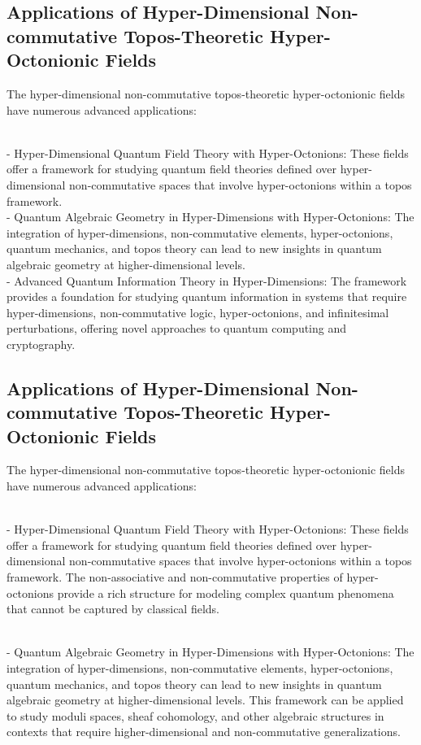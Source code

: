 \documentclass{article}
\begin{document}
\subsection{Applications of Hyper-Dimensional Non-commutative Topos-Theoretic Hyper-Octonionic Fields}
The hyper-dimensional non-commutative topos-theoretic hyper-octonionic fields have numerous advanced applications:

{\ }\\
- Hyper-Dimensional Quantum Field Theory with Hyper-Octonions: These fields offer a framework for studying quantum field theories defined over hyper-dimensional non-commutative spaces that involve hyper-octonions within a topos framework.
{\ }\\
- Quantum Algebraic Geometry in Hyper-Dimensions with Hyper-Octonions: The integration of hyper-dimensions, non-commutative elements, hyper-octonions, quantum mechanics, and topos theory can lead to new insights in quantum algebraic geometry at higher-dimensional levels.
{\ }\\
- Advanced Quantum Information Theory in Hyper-Dimensions: The framework provides a foundation for studying quantum information in systems that require hyper-dimensions, non-commutative logic, hyper-octonions, and infinitesimal perturbations, offering novel approaches to quantum computing and cryptography.


\subsection{Applications of Hyper-Dimensional Non-commutative Topos-Theoretic Hyper-Octonionic Fields}
The hyper-dimensional non-commutative topos-theoretic hyper-octonionic fields have numerous advanced applications:

{\ }\\
- Hyper-Dimensional Quantum Field Theory with Hyper-Octonions: These fields offer a framework for studying quantum field theories defined over hyper-dimensional non-commutative spaces that involve hyper-octonions within a topos framework. The non-associative and non-commutative properties of hyper-octonions provide a rich structure for modeling complex quantum phenomena that cannot be captured by classical fields.

{\ }\\
- Quantum Algebraic Geometry in Hyper-Dimensions with Hyper-Octonions: The integration of hyper-dimensions, non-commutative elements, hyper-octonions, quantum mechanics, and topos theory can lead to new insights in quantum algebraic geometry at higher-dimensional levels. This framework can be applied to study moduli spaces, sheaf cohomology, and other algebraic structures in contexts that require higher-dimensional and non-commutative generalizations.
\end{document}

